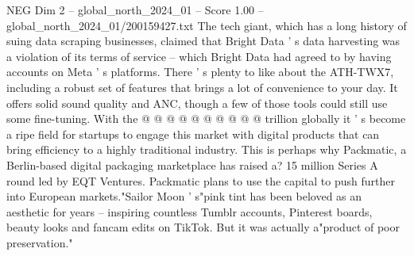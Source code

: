 \begin{textsample}{NEG Dim 2 – global\_north\_2024\_01 – Score 1.00 – global\_north\_2024\_01/200159427.txt}
The tech giant, which has a long history of suing data scraping businesses, claimed that Bright Data ' s data harvesting was a violation of its terms of service -- which Bright Data had agreed to by having accounts on Meta ' s platforms.
There ' s plenty to like about the ATH-TWX7, including a robust set of features that brings a lot of convenience to your day.
It offers solid sound quality and ANC, though a few of those tools could still use some fine-tuning.
With the @ @ @ @ @ @ @ @ @ @ trillion globally it ' s become a ripe field for startups to engage this market with digital products that can bring efficiency to a highly traditional industry.
This is perhaps why Packmatic, a Berlin-based digital packaging marketplace has raised a? 15 million Series A round led by EQT Ventures.
Packmatic plans to use the capital to push further into European markets."Sailor Moon ' s"pink tint has been beloved as an aesthetic for years -- inspiring countless Tumblr accounts, Pinterest boards, beauty looks and fancam edits on TikTok.
But it was actually a"product of poor preservation."

\end{textsample}
